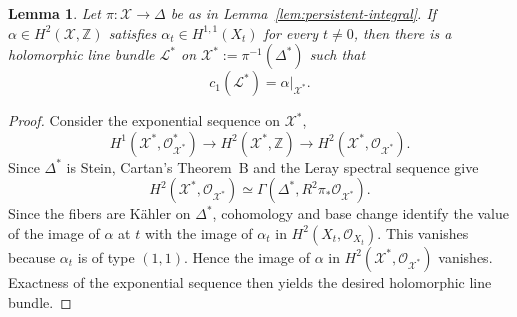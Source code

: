 \documentclass[11pt,letterpaper]{amsart}
\numberwithin{equation}{section}
\newcommand{\ZZ}{\mathbb{Z}}
\newcommand{\cal}{\mathcal}
\def\cL{{\cal L}}
\def\cX{{\cal X}}
\newtheorem{lemm}[prop]{Lemma}
\begin{document}
\begin{lemm}\label{lem:linebundle-punctured}
Let $\pi:\cX\to\Delta$ be as in Lemma~\ref{lem:persistent-integral}. If
$\alpha\in H^2(\cX,\ZZ)$ satisfies
$\alpha_t\in H^{1,1}(X_t)$ for every $t\ne0$, then there is a holomorphic line
bundle $\cL^*$ on $\cX^*:=\pi^{-1}(\Delta^*)$ such that
\[
 c_1(\cL^*)=\alpha|_{\cX^*}.
\]
\end{lemm}
\begin{proof}
Consider the exponential sequence on $\cX^*$,
\[
 H^1(\cX^*,\mathcal O_{\cX^*}^*)\longrightarrow
 H^2(\cX^*,\ZZ)\longrightarrow H^2(\cX^*,\mathcal O_{\cX^*}).
\]
Since $\Delta^*$ is Stein, Cartan's Theorem~B and the Leray spectral sequence give
\[
 H^2(\cX^*,\mathcal O_{\cX^*})
 \simeq\Gamma(\Delta^*,R^2\pi_*\mathcal O_{\cX^*}).
\]
Since the fibers are K\"ahler on $\Delta^*$, cohomology and base change
identify the value of the image of $\alpha$ at $t$ with the image of
$\alpha_t$ in $H^2(X_t,\mathcal O_{X_t})$. This vanishes because
$\alpha_t$ is of type $(1,1)$. Hence the image of $\alpha$ in $H^2(\cX^*,\mathcal O_{\cX^*})$ vanishes. Exactness of the exponential sequence then yields the desired holomorphic line bundle.
\end{proof}
\end{document}
